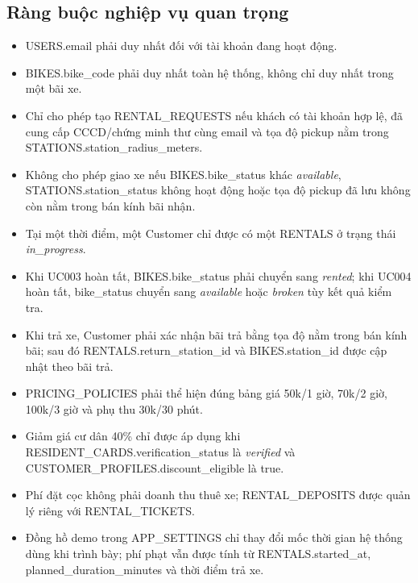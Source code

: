 \subsection{Ràng buộc nghiệp vụ quan trọng}
\begin{itemize}
  \item USERS.email phải duy nhất đối với tài khoản đang hoạt động.
  \item BIKES.bike\_code phải duy nhất toàn hệ thống, không chỉ duy nhất trong một bãi xe.
  \item Chỉ cho phép tạo RENTAL\_REQUESTS nếu khách có tài khoản hợp lệ, đã cung cấp CCCD/chứng minh thư cùng email và tọa độ pickup nằm trong STATIONS.station\_radius\_meters.
  \item Không cho phép giao xe nếu BIKES.bike\_status khác \textit{available}, STATIONS.station\_status không hoạt động hoặc tọa độ pickup đã lưu không còn nằm trong bán kính bãi nhận.
  \item Tại một thời điểm, một Customer chỉ được có một RENTALS ở trạng thái \textit{in\_progress}.
  \item Khi UC003 hoàn tất, BIKES.bike\_status phải chuyển sang \textit{rented}; khi UC004 hoàn tất, bike\_status chuyển sang \textit{available} hoặc \textit{broken} tùy kết quả kiểm tra.
  \item Khi trả xe, Customer phải xác nhận bãi trả bằng tọa độ nằm trong bán kính bãi; sau đó RENTALS.return\_station\_id và BIKES.station\_id được cập nhật theo bãi trả.
  \item PRICING\_POLICIES phải thể hiện đúng bảng giá 50k/1 giờ, 70k/2 giờ, 100k/3 giờ và phụ thu 30k/30 phút.
  \item Giảm giá cư dân 40\% chỉ được áp dụng khi RESIDENT\_CARDS.verification\_status là \textit{verified} và CUSTOMER\_PROFILES.discount\_eligible là true.
  \item Phí đặt cọc không phải doanh thu thuê xe; RENTAL\_DEPOSITS được quản lý riêng với RENTAL\_TICKETS.
  \item Đồng hồ demo trong APP\_SETTINGS chỉ thay đổi mốc thời gian hệ thống dùng khi trình bày; phí phạt vẫn được tính từ RENTALS.started\_at, planned\_duration\_minutes và thời điểm trả xe.
\end{itemize}
